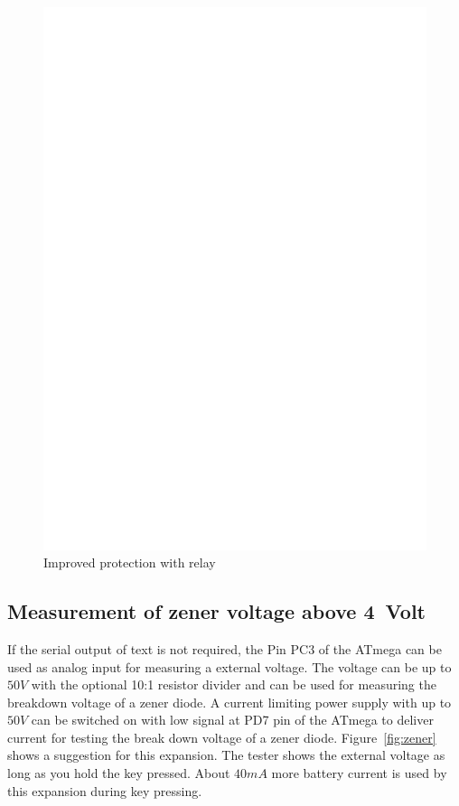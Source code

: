 \begin{figure}[H]
\centering
\includegraphics[width=18cm]{../FIG/relay_um_addon.eps}
\caption{Improved protection with relay}
\label{fig:relay_um_addon}
\end{figure}

\subsection{Measurement of zener voltage above 4~Volt}

If the serial output of text is not required, the Pin PC3 of the ATmega can be used as analog
input for measuring a external voltage. The voltage can be up to \(50V\) with the optional 10:1 resistor
divider and can be used for measuring the breakdown voltage of a zener diode. 
A current limiting power supply with up to \(50V\) can be switched on with low signal at PD7 pin of the
ATmega to deliver current for testing the break down voltage of a zener diode.
Figure~\ref{fig:zener} shows a suggestion for this expansion.
The tester shows the external voltage as long as you hold the key pressed.
About \(40mA\) more battery current is used by this expansion during key pressing.

